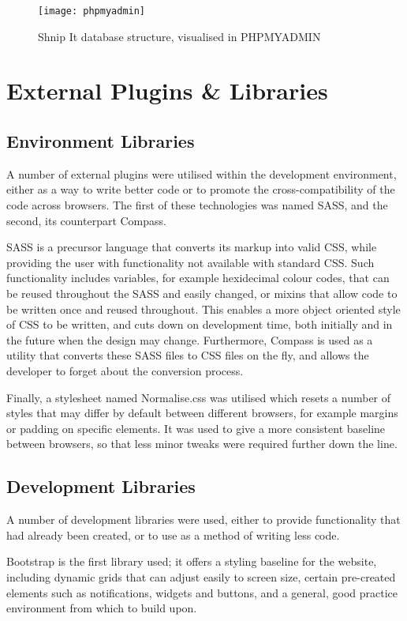 \begin{figure}[htb!]
  \centering
  \texttt{[image: phpmyadmin]}
  \caption{Shnip It database structure, visualised in PHPMYADMIN \label{phpmyadmin}}
\end{figure}

\section{External Plugins \& Libraries}
\subsection{Environment Libraries}
A number of external plugins were utilised within the development environment, either as a way to write better code or to promote the cross-compatibility of the code across browsers.
The first of these technologies was named SASS, and the second, its counterpart Compass. 

SASS is a precursor language that converts its markup into valid CSS, while providing the user with functionality not available with standard CSS.
Such functionality includes variables, for example hexidecimal colour codes, that can be reused throughout the SASS and easily changed, or mixins that allow code to be written once and reused throughout. 
This enables a more object oriented style of CSS to be written, and cuts down on development time, both initially and in the future when the design may change.
Furthermore, Compass is used as a utility that converts these SASS files to CSS files on the fly, and allows the developer to forget about the conversion process.

Finally, a stylesheet named Normalise.css was utilised which resets a number of styles that may differ by default between different browsers, for example margins or padding on specific elements.
It was used to give a more consistent baseline between browsers, so that less minor tweaks were required further down the line.

\subsection{Development Libraries}
A number of development libraries were used, either to provide functionality that had already been created, or to use as a method of writing less code.

Bootstrap is the first library used; it offers a styling baseline for the website, including dynamic grids that can adjust easily to screen size, certain pre-created elements such as notifications, widgets and buttons, and a general, good practice environment from which to build upon.

